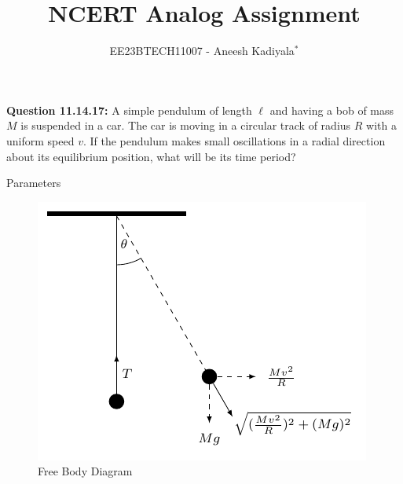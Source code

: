 \documentclass[journal,12pt,twocolumn]{IEEEtran}
\theoremstyle{remark}
\begin{document}

\vspace{3cm}

\title{NCERT Analog Assignment}
\author{EE23BTECH11007 - Aneesh Kadiyala$^{*}$%
}
\maketitle
\newpage
\bigskip

\renewcommand{\thefigure}{\theenumi}
\renewcommand{\thetable}{\theenumi}

\vspace{3cm}
\textbf{Question 11.14.17:} A simple pendulum of length $\ell$ and having a bob of mass $M$ is suspended in a car. The car is moving in a circular track of radius $R$ with a uniform speed $v$. If the pendulum makes small oscillations in a radial direction about its equilibrium position, what will be its time period?
\\
\solution
\fi
\begin{table}[h!]
    \centering
    
    \caption{Parameters}
    \label{tab:physics-11-14-17}
\end{table}
\begin{figure}[h!]
\centering
\includegraphics{ncert-physics/11/14/17/figs/fbd.pdf}
\caption{Free Body Diagram}
\label{fig:analog_11_14_17_1}
\end{figure}
\end{document}
